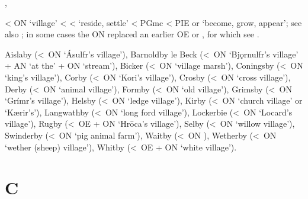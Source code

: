 \documentclass[12pt,letterpaper,oneside,article,draft]{memoir}
\begin{document}
\begin{Lemma}
\begin{Also}
	, 
\end{Also}
\begin{Etymology}
	< ON  ‘village’ <  <  ‘reside, settle’ < PGmc  <
		PIE  or  ‘become, grow, appear’; see also ; in some cases
		the ON  replaced an earlier OE  or , for which see .
\end{Etymology}
\begin{Examples}
	Aislaby (<~ON  ‘Ásulfr’s village’),
	Barnoldby le Beck (<~ON  ‘Bjǫrnulfr’s village’ + AN  ‘at the’ + ON  ‘stream’),
	Bicker (<~ON  ‘village marsh’),
	Coningsby (<~ON  ‘king’s village’),
	Corby (<~ON  ‘Kori’s village’),
	Crosby (<~ON  ‘cross village’),
	Derby (<~ON  ‘animal village’),
	Formby (<~ON  ‘old village’),
	Grimsby (<~ON  ‘Grímr’s village’),
	Helsby (<~ON  ‘ledge village’),
	Kirby (<~ON  ‘church village’ or  ‘Kærir’s’),
	Langwathby (<~ON  ‘long ford village’),
	Lockerbie (<~ON  ‘Locard’s village’),
	Rugby (<~OE  + ON  ‘Hrōca’s village’),
	Selby (<~ON  ‘willow village’),
	Swinderby (<~ON  ‘pig animal farm’),
	Waitby (<~ON ),
	Wetherby (<~ON  ‘wether (sheep) village’),
	Whitby (<~OE  + ON  ‘white village’).
\end{Examples}
\end{Lemma}

\section*{C}
\end{document}
